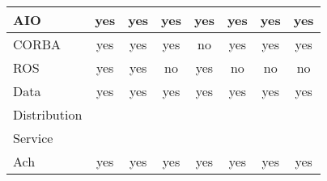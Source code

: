 \begin{table}
\begin{tabular}{l || c | c | c | c | c | c | c}
\hline
AIO                             & yes         & yes             & yes          & yes       & yes         & yes     & yes \\
\hline
CORBA                           & yes         & yes             & yes          & no        & yes         & yes     & yes \\
\hline
ROS                             & yes         & yes             & no           & yes       & no          & no      & no \\
\hline
Data                            & yes         & yes             & yes          & yes       & yes         & yes     & yes\\
Distribution                    &             &                 &              &           &             &         &     \\
Service                         &             &                 &              &           &             &         &     \\
\hline
Ach                             & yes         & yes             & yes          & yes       & yes         & yes     & yes\\


\hline
\end{tabular}
\label{table:ipc}
\normalsize
\end{table}
